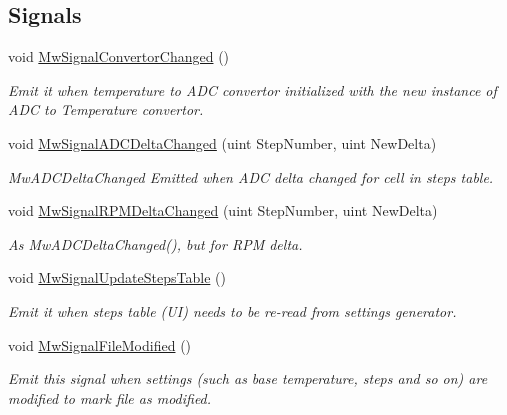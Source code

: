 \subsection*{Signals}
\begin{DoxyCompactItemize}
\item 
\mbox{\label{class_main_window_abc97afb888a70565123689a1444ab4b9}} 
void \hyperlink{class_main_window_abc97afb888a70565123689a1444ab4b9}{Mw\+Signal\+Convertor\+Changed} ()
\begin{DoxyCompactList}\small\item\em Emit it when temperature to A\+DC convertor initialized with the new instance of A\+DC to Temperature convertor. \end{DoxyCompactList}\item 
void \hyperlink{class_main_window_a37ea64ccb9b5bcf9bb976602d42aadfa}{Mw\+Signal\+A\+D\+C\+Delta\+Changed} (uint Step\+Number, uint New\+Delta)
\begin{DoxyCompactList}\small\item\em Mw\+A\+D\+C\+Delta\+Changed Emitted when A\+DC delta changed for cell in steps table. \end{DoxyCompactList}\item 
void \hyperlink{class_main_window_a7b5fab96f0c2363958436141a3aae65b}{Mw\+Signal\+R\+P\+M\+Delta\+Changed} (uint Step\+Number, uint New\+Delta)
\begin{DoxyCompactList}\small\item\em As Mw\+A\+D\+C\+Delta\+Changed(), but for R\+PM delta. \end{DoxyCompactList}\item 
\mbox{\label{class_main_window_abf2e8820a7173fb2231e7f835160d8a1}} 
void \hyperlink{class_main_window_abf2e8820a7173fb2231e7f835160d8a1}{Mw\+Signal\+Update\+Steps\+Table} ()
\begin{DoxyCompactList}\small\item\em Emit it when steps table (UI) needs to be re-\/read from settings generator. \end{DoxyCompactList}\item 
\mbox{\label{class_main_window_a993ac6516e8f6f81a42dc878fc9fc8c9}} 
void \hyperlink{class_main_window_a993ac6516e8f6f81a42dc878fc9fc8c9}{Mw\+Signal\+File\+Modified} ()
\begin{DoxyCompactList}\small\item\em Emit this signal when settings (such as base temperature, steps and so on) are modified to mark file as modified. \end{DoxyCompactList}\end{DoxyCompactItemize}
